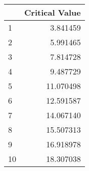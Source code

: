 \begin{tabular}{lr}
\toprule
{} &  Critical Value \\
\midrule
1  &        3.841459 \\
2  &        5.991465 \\
3  &        7.814728 \\
4  &        9.487729 \\
5  &       11.070498 \\
6  &       12.591587 \\
7  &       14.067140 \\
8  &       15.507313 \\
9  &       16.918978 \\
10 &       18.307038 \\
\bottomrule
\end{tabular}
